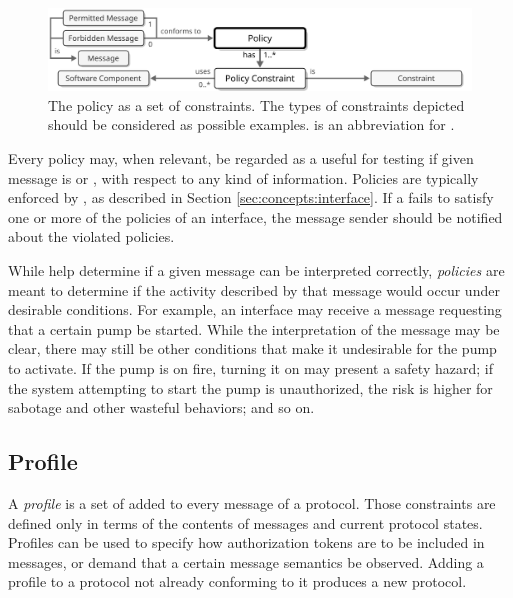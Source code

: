 \vfill

\begin{figure}[ht!]
  \centering
  \includegraphics[scale=0.9]{figures/policy}
  \caption{
    The policy as a set of constraints.
    The types of constraints depicted should be considered as possible examples.
     is an abbreviation for .
  }
  \label{fig:policy}
\end{figure}

Every policy may, when relevant, be regarded as a  useful for testing if given message is  or , with respect to any kind of information.
Policies are typically enforced by , as described in Section \ref{sec:concepts:interface}.
If a  fails to satisfy one or more of the policies of an interface, the message sender should be notified about the violated policies.

While  help determine if a given message can be interpreted correctly, \textit{policies} are meant to determine if the activity described by that message would occur under desirable conditions.
For example, an interface may receive a message requesting that a certain pump be started.
While the interpretation of the message may be clear, there may still be other conditions that make it undesirable for the pump to activate.
If the pump is on fire, turning it on may present a safety hazard; if the system attempting to start the pump is unauthorized, the risk is higher for sabotage and other wasteful behaviors; and so on.

\newpage

\subsection{Profile}
\label{sec:concepts:profile}

A \textit{profile} is a set of  added to every message of a protocol.
Those constraints are defined only in terms of the contents of messages and current protocol states.
Profiles can be used to specify how authorization tokens are to be included in messages, or demand that a certain message semantics be observed.
Adding a profile to a protocol not already conforming to it produces a new protocol.

